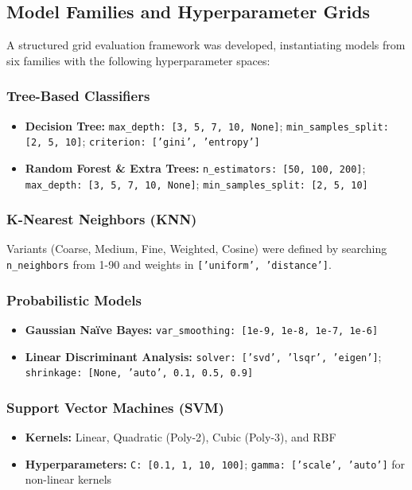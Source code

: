 \documentclass[11pt]{article}
\begin{document}
\subsection{Model Families and Hyperparameter Grids}
A structured grid evaluation framework was developed, instantiating models from six families with the following hyperparameter spaces:

\subsubsection{Tree-Based Classifiers}
\begin{itemize}[leftmargin=*,nosep]
    \item \textbf{Decision Tree:} \texttt{max\_depth: [3, 5, 7, 10, None]}; \texttt{min\_samples\_split: [2, 5, 10]}; \texttt{criterion: ['gini', 'entropy']}
    \item \textbf{Random Forest \& Extra Trees:} \texttt{n\_estimators: [50, 100, 200]}; \texttt{max\_depth: [3, 5, 7, 10, None]}; \texttt{min\_samples\_split: [2, 5, 10]}
\end{itemize}

\subsubsection{K-Nearest Neighbors (KNN)}
Variants (Coarse, Medium, Fine, Weighted, Cosine) were defined by searching \texttt{n\_neighbors} from 1-90 and weights in \texttt{['uniform', 'distance']}.

\subsubsection{Probabilistic Models}
\begin{itemize}[leftmargin=*,nosep]
    \item \textbf{Gaussian Naïve Bayes:} \texttt{var\_smoothing: [1e-9, 1e-8, 1e-7, 1e-6]}
    \item \textbf{Linear Discriminant Analysis:} \texttt{solver: ['svd', 'lsqr', 'eigen']}; \texttt{shrinkage: [None, 'auto', 0.1, 0.5, 0.9]}
\end{itemize}

\subsubsection{Support Vector Machines (SVM)}
\begin{itemize}[leftmargin=*,nosep]
    \item \textbf{Kernels:} Linear, Quadratic (Poly-2), Cubic (Poly-3), and RBF
    \item \textbf{Hyperparameters:} \texttt{C: [0.1, 1, 10, 100]}; \texttt{gamma: ['scale', 'auto']} for non-linear kernels
\end{itemize}
\end{document}
